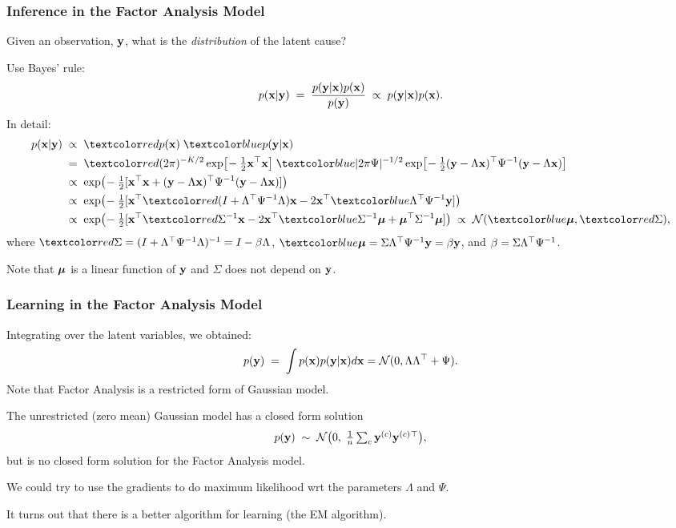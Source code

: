 \begin{frame}
\frametitle{Inference in the Factor Analysis Model}

Given an observation, $\mathbf y$, what is the \emph{distribution} of the
latent cause?

Use Bayes' rule:
\[
p(\mathbf x|\mathbf y)\;=\;\frac{p(\mathbf y|\mathbf x)p(\mathbf x)}{p(\mathbf y)}
\;\propto\;p(\mathbf y|\mathbf x)p(\mathbf x).
\]
In detail:
\[
\begin{split}
p(\bfx|\bfy)\;&\propto\;\Red{p(\bfx)}\;\Blue{p(\bfy|\bfx)}\\
&=\;\Red{(2\pi)^{-K/2}\exp\!\big[\!-\tfrac{1}{2}\bfx\T\bfx\big]}\;
\Blue{|2\pi\Psi|^{-1/2}\exp\!\big[\!-\tfrac{1}{2}(\bfy-\Lambda\bfx)\T
\Psi^{-1}(\bfy-\Lambda\bfx)\big]}\\
&\propto\;\exp\!\big(\!-\tfrac{1}{2}[\bfx\T\bfx+
(\bfy-\Lambda\bfx)\T\Psi^{-1}(\bfy-\Lambda \bfx)]\big)\\
&\propto\;\exp\!\big(\!-\tfrac{1}{2}[\bfx\T
\Red{(I+\Lambda\T\Psi^{-1}\Lambda)}\bfx-2\bfx\T
\Blue{\Lambda\T\Psi^{-1}\bfy}]\big)\\
&\propto\;\exp\!\big(\!-\tfrac{1}{2}[\bfx\T
\Red{\Sigma^{-1}}\bfx-2\bfx\T\Blue{\Sigma^{-1}\bmu}
+\bmu\T\Sigma^{-1}\bmu]\big)\;\propto\;{\cal N}(\Blue{\bmu},\Red{\Sigma}),
\end{split}
\]
where $\Red{\Sigma=(I+\Lambda\T\Psi^{-1}\Lambda)^{-1}=I-\beta\Lambda}$, $\Blue{\bmu=\Sigma\Lambda\T\Psi^{-1}\bfy=\beta\bfy}$, and $\beta=\Sigma\Lambda{\scriptsize^{\top}}\Psi^{-1}$.

Note that ${\boldsymbol{\mu}}$ is a linear function of $\mathbf y$ and $\Sigma$ does not
depend on $\mathbf y$.


\end{frame}


\begin{frame}
\frametitle{Learning in the Factor Analysis Model}

Integrating over the latent variables, we obtained:
\[
p(\mathbf y)\;=\;\int p(\mathbf x) p(\mathbf y|\mathbf x) d\mathbf x = {\cal N}(0,\Lambda \Lambda{\scriptsize^{\top}} +
\Psi).
\]
Note that Factor Analysis is a restricted form of Gaussian model.

The unrestricted (zero mean) Gaussian model has a closed form solution
\[
p(\mathbf y)\;\sim\;{\cal N}\big(0,\;\textstyle\frac{1}{n}\sum_c\mathbf y^{(c)}\mathbf y^{(c)}{\scriptsize^{\top}}\big),
\]
but is no closed form solution for the Factor Analysis model.

We could try to use the gradients to do maximum likelihood wrt the parameters
$\Lambda$ and $\Psi$.

It turns out that there is a better algorithm for learning (the EM algorithm).
\end{frame}

